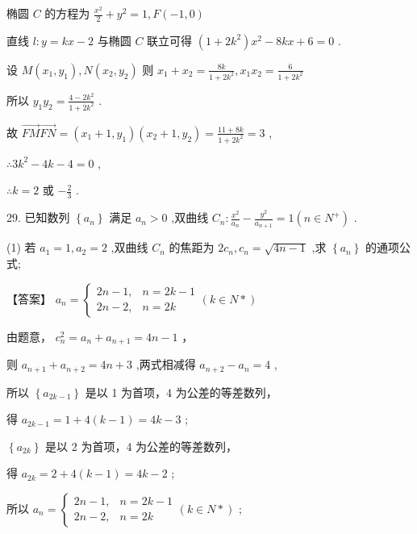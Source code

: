 \documentclass[10pt]{article}
\begin{document}
椭圆 \(C\) 的方程为 \(\frac{{x}^{2}}{2} + {y}^{2} = 1,F\left( {-1,0}\right)\)

直线 \(l : y = {kx} - 2\) 与椭圆 \(C\) 联立可得 \(\left( {1 + 2{k}^{2}}\right) {x}^{2} - {8kx} + 6 = 0\) .

设 \(M\left( {{x}_{1},{y}_{1}}\right) ,N\left( {{x}_{2},{y}_{2}}\right)\) 则 \({x}_{1} + {x}_{2} = \frac{8k}{1 + 2{k}^{2}},{x}_{1}{x}_{2} = \frac{6}{1 + 2{k}^{2}}\)

所以 \({y}_{1}{y}_{2} = \frac{4 - 2{k}^{2}}{1 + 2{k}^{2}}\) .

故 \(\overrightarrow{FM}\overrightarrow{FN} = \left( {{x}_{1} + 1,{y}_{1}}\right) \left( {{x}_{2} + 1,{y}_{2}}\right)  = \frac{{11} + {8k}}{1 + 2{k}^{2}} = 3\) ,

\(\therefore 3{k}^{2} - {4k} - 4 = 0\) ,

\(\therefore k = 2\) 或 \(- \frac{2}{3}\) .

29. 已知数列 \(\left\{  {a}_{n}\right\}\) 满足 \({a}_{n} > 0\) ,双曲线 \({C}_{n} : \frac{{x}^{2}}{{a}_{n}} - \frac{{y}^{2}}{{a}_{n + 1}} = 1\left( {n \in  {N}^{ + }}\right)\) .

(1) 若 \({a}_{1} = 1,{a}_{2} = 2\) ,双曲线 \({C}_{n}\) 的焦距为 \(2{c}_{n},{c}_{n} = \sqrt{{4n} - 1}\) ,求 \(\left\{  {a}_{n}\right\}\) 的通项公式;

【答案】 \({a}_{n} = \left\{  {\begin{array}{ll} {2n} - 1, & n = {2k} - 1 \\  {2n} - 2, & n = {2k} \end{array}\left( {k \in  N * }\right) }\right.\)

由题意， \({c}_{n}^{2} = {a}_{n} + {a}_{n + 1} = {4n} - 1\) ，

则 \({a}_{n + 1} + {a}_{n + 2} = {4n} + 3\) ,两式相减得 \({a}_{n + 2} - {a}_{n} = 4\) ,

所以 \(\left\{  {a}_{{2k} - 1}\right\}\) 是以 1 为首项，4 为公差的等差数列，

得 \({a}_{{2k} - 1} = 1 + 4\left( {k - 1}\right)  = {4k} - 3\) ;

\(\left\{  {a}_{2k}\right\}\) 是以 2 为首项，4 为公差的等差数列，

得 \({a}_{2k} = 2 + 4\left( {k - 1}\right)  = {4k} - 2\) ;

所以 \({a}_{n} = \left\{  {\begin{array}{ll} {2n} - 1, & n = {2k} - 1 \\  {2n} - 2, & n = {2k} \end{array}\left( {k \in  N * }\right) }\right.\) ;
\end{document}
